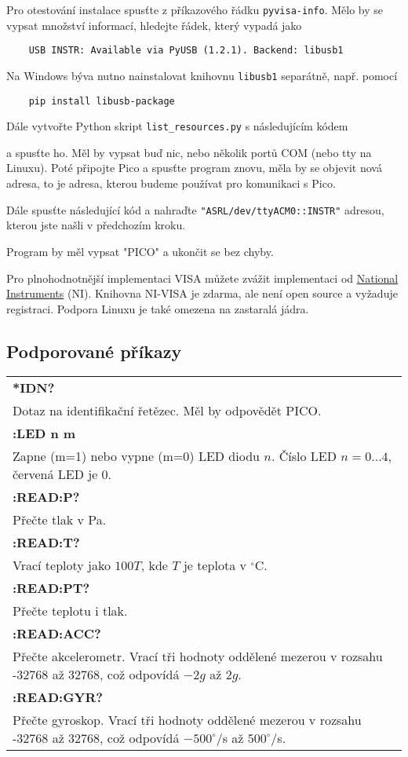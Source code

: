 Pro otestování instalace spusťte z příkazového řádku \verb|pyvisa-info|. Mělo by se vypsat množství informací, hledejte řádek, který vypadá jako
\begin{verbatim}
    USB INSTR: Available via PyUSB (1.2.1). Backend: libusb1
\end{verbatim}
Na Windows býva nutno nainstalovat knihovnu \verb|libusb1| separátně, např. pomocí
\begin{verbatim}
    pip install libusb-package
\end{verbatim}


Dále vytvořte Python skript \verb|list_resources.py| s následujícím kódem

a spusťte ho. Měl by vypsat buď nic, nebo několik portů COM (nebo tty na Linuxu). Poté připojte Pico a spusťte program znovu, měla by se objevit nová adresa, to je adresa, kterou budeme používat pro komunikaci s Pico.

Dále spusťte následující kód a nahraďte \verb|"ASRL/dev/ttyACM0::INSTR"| adresou, kterou jste našli v předchozím kroku.

Program by měl vypsat "PICO" a ukončit se bez chyby.

Pro plnohodnotnější implementaci VISA můžete zvážit implementaci od \href{https://www.ni.com/en/support/downloads/drivers/download.ni-visa.html#548367}{National Instruments} (NI). Knihovna NI-VISA je zdarma, ale není open source a vyžaduje registraci. Podpora Linuxu je také omezena na zastaralá jádra.

\subsection{Podporované příkazy}
\begin{tabular}{p{15cm}}
    \textbf{*IDN?}\\
    Dotaz na identifikační řetězec. Měl by odpovědět PICO.
    \\\hline
    \textbf{:LED n m}\\
    Zapne (m=1) nebo vypne (m=0) LED diodu $n$. Číslo LED $n = 0 \dots 4$, červená LED je 0.
    \\\hline
    \textbf{:READ:P?}\\
    Přečte tlak v Pa.
    \\\hline
    \textbf{:READ:T?}\\
    Vrací teploty jako $100T$, kde $T$ je teplota v $^\circ$C.
    \\\hline
    \textbf{:READ:PT?}\\
    Přečte teplotu i tlak.
    \\\hline
    \textbf{:READ:ACC?}\\
    Přečte akcelerometr. Vrací tři hodnoty oddělené mezerou v rozsahu -32768 až 32768, což odpovídá $-2g$ až $2g$.
    \\\hline
    \textbf{:READ:GYR?}\\
    Přečte gyroskop. Vrací tři hodnoty oddělené mezerou v rozsahu -32768 až 32768, což odpovídá $-500^\circ$/s až $500^\circ$/s.
\end{tabular}


